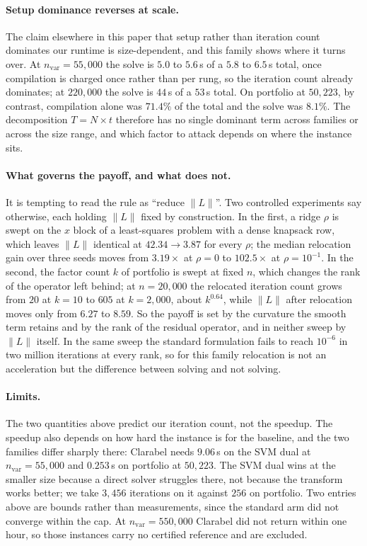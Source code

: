 \documentclass[11pt]{article}
\begin{document}
\paragraph{Setup dominance reverses at scale.}
The claim elsewhere in this paper that setup rather than iteration count
dominates our runtime is size-dependent, and this family shows where it
turns over. At $n_{\mathrm{var}} = 55{,}000$ the solve is $5.0$ to
$5.6$\,s of a $5.8$ to $6.5$\,s total, once compilation is charged once
rather than per rung, so the iteration count already dominates; at
$220{,}000$ the solve is $44$\,s of a $53$\,s total. On portfolio at
$50{,}223$, by contrast, compilation alone was $71.4\%$ of the total and the
solve was $8.1\%$. The decomposition $T = N \times t$ therefore has no single
dominant term across families or across the size range, and which factor to
attack depends on where the instance sits.

\paragraph{What governs the payoff, and what does not.}
It is tempting to read the rule as ``reduce $\|L\|$''. Two controlled
experiments say otherwise, each holding $\|L\|$ fixed by construction. In
the first, a ridge $\rho$ is swept on the $x$ block of a least-squares
problem with a dense knapsack row, which leaves $\|L\|$ identical at
$42.34 \to 3.87$ for every $\rho$; the median relocation gain over three
seeds moves from $3.19\times$ at $\rho=0$ to $102.5\times$ at $\rho=10^{-1}$.
In the second, the factor count $k$ of portfolio is swept at fixed $n$,
which changes the rank of the operator left behind; at $n=20{,}000$ the
relocated iteration count grows from $20$ at $k=10$ to $605$ at $k=2{,}000$,
about $k^{0.64}$, while $\|L\|$ after relocation moves only from $6.27$ to
$8.59$. So the payoff is set by the curvature the smooth term retains and by
the rank of the residual operator, and in neither sweep by $\|L\|$ itself.
In the same sweep the standard formulation fails to reach $10^{-6}$ in two
million iterations at every rank, so for this family relocation is not an
acceleration but the difference between solving and not solving.

\paragraph{Limits.}
The two quantities above predict our iteration count, not the speedup. The
speedup also depends on how hard the instance is for the baseline, and the
two families differ sharply there: Clarabel needs $9.06$\,s on the SVM dual
at $n_{\mathrm{var}} = 55{,}000$ and $0.253$\,s on portfolio at $50{,}223$.
The SVM dual wins at the smaller size because a direct solver struggles
there, not because the transform works better; we take $3{,}456$ iterations
on it against $256$ on portfolio. Two entries above are bounds rather than
measurements, since the standard arm did not converge within the cap. At
$n_{\mathrm{var}} = 550{,}000$ Clarabel did not return within one hour, so
those instances carry no certified reference and are excluded.
\end{document}
